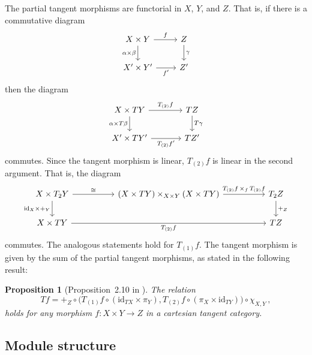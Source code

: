 \documentclass[12pt,reqno, a4paper]{amsart}
\numberwithin{equation}{section}
\theoremstyle{plain}
\newtheorem{Proposition}[Theorem]{Proposition}
\theoremstyle{definition}
\theoremstyle{remark}
\newcommand{\id}{\mathrm{id}}
\newcommand{\Tpart}[1]{T_{(#1)}}
\begin{document}
The partial tangent morphisms are functorial in $X$, $Y$, and $Z$. That is, if there is a commutative diagram
\begin{equation*}
\begin{tikzcd}%
X \times Y
\ar[r, "f"]
\ar[d, "\alpha \times \beta"']
&
Z
\ar[d, "\gamma"]
\\
X' \times Y'
\ar[r, "f'"']
&
Z'
\end{tikzcd}
\end{equation*}
then the diagram
\begin{equation}
\label{eq:T2functorial}
\begin{tikzcd}[column sep=large]
X \times TY
\ar[r, "\Tpart{2} f"]
\ar[d, "\alpha \times T\beta"']
&
TZ
\ar[d, "T\gamma"]
\\
X' \times TY'
\ar[r, "\Tpart{2} f'"']
&
TZ'
\end{tikzcd}
\end{equation}
commutes. Since the tangent morphism is linear, $\Tpart{2}f$ is linear in the second argument. That is, the diagram
\begin{equation}
\label{eq:T2linear}
\begin{tikzcd}[column sep=5em]
X \times T_2 Y
\ar[r, "\cong"]
\ar[d, "\id_X \times +_Y"']
&
(X \times TY) \times_{X \times Y} (X \times TY)
\ar[r, "{\Tpart{2}f \, \times_f \, \Tpart{2} f}"]
&
T_2 Z
\ar[d, "+_Z"]
\\
X \times TY
\ar[rr, "\Tpart{2} f"']
&&
TZ
\end{tikzcd}
\end{equation}
commutes. The analogous statements hold for $\Tpart{1} f$. The tangent morphism is given by the sum of the partial tangent morphisms, as stated in the following result:

\begin{Proposition}[Proposition~2.10 in \cite{CockettCruttwell:2014}]
\label{prop:TSumPartials}
The relation
\begin{equation*}
  Tf = +_Z \circ
  \bigl(\Tpart{1} f \circ
  (\id_{TX} \times \pi_Y),
  \Tpart{2} f \circ
  (\pi_X \times \id_{TY})
  \bigr) \circ
  \chi_{X,Y}
  \,,
\end{equation*}
holds for any morphism $f: X \times Y \to Z$ in a cartesian tangent category.
\end{Proposition}



\subsection{Module structure}
\label{sec:ModStructure}
\end{document}
